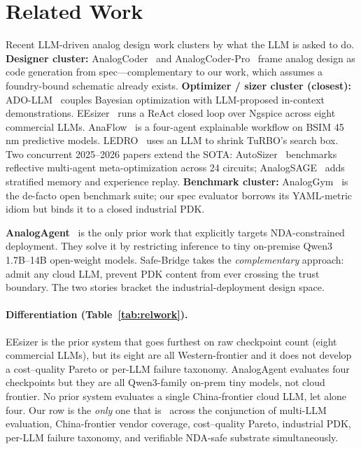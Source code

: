 
\section{Related Work}
\label{sec:related}

Recent LLM-driven analog design work clusters by what the LLM is
asked to do. \textbf{Designer cluster:} AnalogCoder~\cite{analogcoder}
and AnalogCoder-Pro~\cite{analogcoderpro} frame analog design as
code generation from spec---complementary to our work, which
assumes a foundry-bound schematic already exists. \textbf{Optimizer /
sizer cluster (closest):} ADO-LLM~\cite{adollm} couples Bayesian
optimization with LLM-proposed in-context demonstrations.
EEsizer~\cite{eesizer} runs a ReAct closed loop over Ngspice across
eight commercial LLMs. AnaFlow~\cite{anaflow} is a four-agent
explainable workflow on BSIM 45\,nm predictive models.
LEDRO~\cite{ledro} uses an LLM to shrink TuRBO's search box. Two
concurrent 2025--2026 papers extend the SOTA:
AutoSizer~\cite{autosizer} benchmarks reflective multi-agent
meta-optimization across 24 circuits;
AnalogSAGE~\cite{analogsage} adds stratified memory and experience
replay. \textbf{Benchmark cluster:} AnalogGym~\cite{analoggym} is
the de-facto open benchmark suite; our spec evaluator borrows its
YAML-metric idiom but binds it to a closed industrial PDK.

\textbf{AnalogAgent}~\cite{analogagent} is the only prior work that
explicitly targets NDA-constrained deployment. They solve it by
restricting inference to tiny on-premise Qwen3 1.7B--14B open-weight
models. Safe-Bridge takes the \emph{complementary} approach: admit
any cloud LLM, prevent PDK content from ever crossing the trust
boundary. The two stories bracket the industrial-deployment design
space.

\paragraph{Differentiation (Table~\ref{tab:relwork}).}
EEsizer is the prior system that goes furthest on raw checkpoint
count (eight commercial LLMs), but its eight are all
Western-frontier and it does not develop a cost--quality Pareto or
per-LLM failure taxonomy. AnalogAgent evaluates four checkpoints
but they are all Qwen3-family on-prem tiny models, not cloud
frontier. No prior system evaluates a single China-frontier cloud
LLM, let alone four. Our row is the \emph{only} one that is \yes\
across the conjunction of multi-LLM evaluation, China-frontier
vendor coverage, cost--quality Pareto, industrial PDK, per-LLM
failure taxonomy, and verifiable NDA-safe substrate simultaneously.

